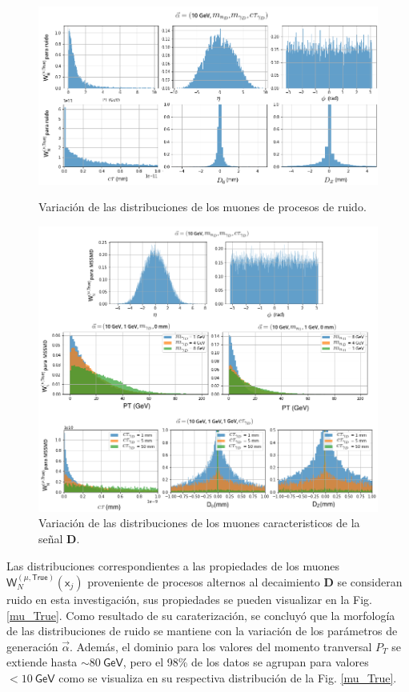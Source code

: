 \begin{figure}[!t]
\centering
\includegraphics[width=.9\textwidth]{Cap4/imagenes/propiedades_True_notMSSM.png}
\caption{Variación de las distribuciones de los muones de procesos de ruido.}
\label{mu_True}

\includegraphics[width=.9\textwidth]{Cap4/imagenes/propiedades_True_MSSM.png}
\caption{Variación de las distribuciones de los muones caracteristicos de la señal \MSSM\textbf{D}.}
\label{mu_True2}
\end{figure}

Las distribuciones correspondientes a las propiedades de los muones $\textsf{W}^{(\mu,\textsf{True})}_N (\textsf{x}_j)$ proveniente de procesos alternos al decaimiento  \MSSM\textbf{D} se consideran ruido en esta investigación, sus propiedades se pueden visualizar en la Fig. \ref{mu_True}. Como resultado de su caraterización, se concluyó que la morfología de las distribuciones de ruido se mantiene con la variación de los parámetros de generación $\vec{\alpha}$. Además, el dominio para los valores del momento tranversal $P_T$ se extiende hasta $\sim 80~ \textsf{GeV}$, pero el 98\% de los datos se agrupan para valores $<10~\textsf{GeV}$ como se visualiza en su respectiva distribución de la Fig. \ref{mu_True}.



